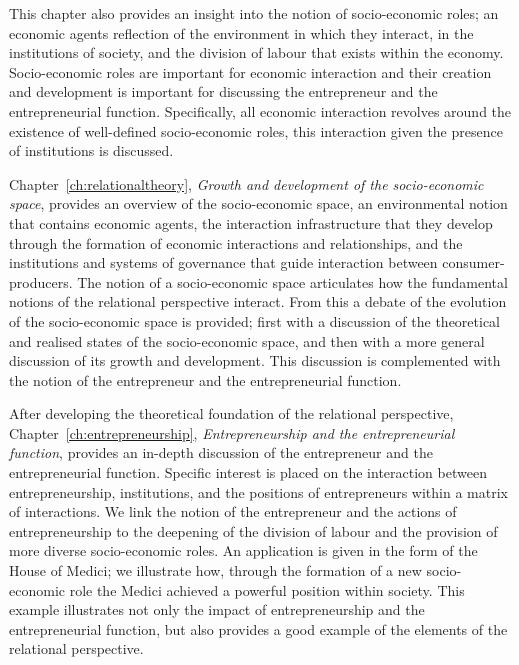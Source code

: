 This chapter also provides an insight into the notion of socio-economic roles; an economic agents reflection of the environment in which they interact, in the institutions of society, and the division of labour that exists within the economy. Socio-economic roles are important for economic interaction and their creation and development is important for discussing the entrepreneur and the entrepreneurial function. Specifically, all economic interaction revolves around the existence of well-defined socio-economic roles, this interaction given the presence of institutions is discussed.

Chapter~\ref{ch:relationaltheory}, \emph{Growth and development of the socio-economic space}, provides an overview of the socio-economic space, an environmental notion that contains economic agents, the interaction infrastructure that they develop through the formation of economic interactions and relationships, and the institutions and systems of governance that guide interaction between consumer-producers. The notion of a socio-economic space articulates how the fundamental notions of the relational perspective interact. From this a debate of the evolution of the socio-economic space is provided; first with a discussion of the theoretical and realised states of the socio-economic space, and then with a more general discussion of its growth and development. This discussion is complemented with the notion of the entrepreneur and the entrepreneurial function.

After developing the theoretical foundation of the relational perspective, Chapter~\ref{ch:entrepreneurship}, \emph{Entrepreneurship and the entrepreneurial function}, provides an in-depth discussion of the entrepreneur and the entrepreneurial function. Specific interest is placed on the interaction between entrepreneurship, institutions, and the positions of entrepreneurs within a matrix of interactions. We link the notion of the entrepreneur and the actions of entrepreneurship to the deepening of the division of labour and the provision of more diverse socio-economic roles. An application is given in the form of the House of Medici; we illustrate how, through the formation of a new socio-economic role the Medici achieved a powerful position within society. This example illustrates not only the impact of entrepreneurship and the entrepreneurial function, but also provides a good example of the elements of the relational perspective.
